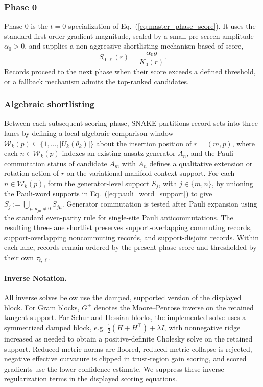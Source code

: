 \documentclass[
  reprint,
  amsmath,
  amssymb,
  aps,
  pra,
  nofootinbib,
  superscriptaddress,
  floatfix
]{revtex4-2}
\begin{document}
\subsubsection{Phase 0}

Phase 0 is the $t=0$ specialization of Eq.~(\ref{eq:master_phase_score}). It uses the standard first-order gradient magnitude, scaled by a small pre-screen amplitude $\alpha_0>0$, and supplies a non-aggressive shortlisting mechanism based of score,
\begin{equation}
S_{0,\ell}(r)=\frac{\alpha_0 g}{K_0(r)}.
\label{eq:phase0_score}
\end{equation}
Records proceed to the next phase when their score exceeds a defined threshold, or a fallback mechanism admits the top-ranked candidates.

\subsubsection{Algebraic shortlisting}
\label{sec:snake_algebraic_shortlisting}

Between each subsequent scoring phase, SNAKE partitions record sets into three lanes by defining a local algebraic comparison window $\mathcal W_k(p)\subseteq\{1,\ldots,|U_k(\theta_k)|\}$ about the insertion position of $r=(m,p)$, where each $n\in\mathcal W_k(p)$ indexes an existing ansatz generator $A_n$, and the Pauli commutation status of candidate $A_m$ with $A_n$ defines a qualitative extension or rotation action of $r$ on the variational manifold context support.
For each $n\in\mathcal W_k(p)$, form the generator-level support $S_j$, with $j\in\{m,n\}$, by unioning the Pauli-word supports in Eq.~(\ref{eq:pauli_word_support}) to give
$S_j:=\bigcup_{\mu:a_{j\mu}\ne0}S_{j\mu}$.
Generator commutation is tested after Pauli expansion using the standard even-parity rule for single-site Pauli anticommutations. The resulting three-lane shortlist preserves support-overlapping commuting records, support-overlapping noncommuting records, and support-disjoint records. Within each lane, records remain ordered by the present phase score and thresholded by their own $\tau_{t,\ell}$.

\paragraph*{Inverse Notation.}
All inverse solves below use the damped, supported version of the displayed block. For Gram blocks, \(G^+\) denotes the Moore--Penrose inverse on the retained tangent support. For Schur and Hessian blocks, the implemented solve uses a symmetrized damped block, e.g. \(\frac12(H+H^{\top})+\lambda I\), with nonnegative ridge increased as needed to obtain a positive-definite Cholesky solve on the retained support. Reduced metric norms are floored, reduced-metric collapse is rejected, negative effective curvature is clipped in trust-region gain scoring, and scored gradients use the lower-confidence estimate. We suppress these inverse-regularization terms in the displayed scoring equations.
\end{document}

